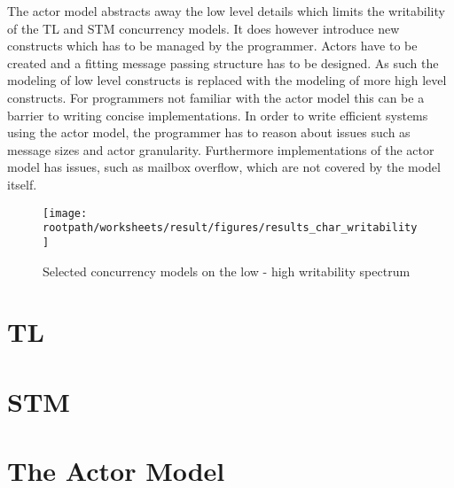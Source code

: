 The actor model abstracts away the low level details which limits the writability of the \ac{TL} and \ac{STM} concurrency models. It does however introduce new constructs which has to be managed by the programmer. Actors have to be created and a fitting message passing structure has to be designed. As such the modeling of low level constructs is replaced with the modeling of more high level constructs. For programmers not familiar with the actor model this can be a barrier to writing concise implementations. In order to write efficient systems using the actor model, the programmer has to reason about issues such as message sizes and actor granularity. Furthermore implementations of the actor model has issues, such as mailbox overflow, which are not covered by the model itself.

\begin{figure}[htbp]
\centering
 \texttt{[image: \\rootpath/worksheets/result/figures/results\_char\_writability]} 
 \caption{Selected concurrency models on the low - high writability spectrum}
\label{fig:results_char_writability}
\end{figure}

\section{\acl{TL}}
\section{\acl{STM}}
\section{The Actor Model}

\worksheetend
